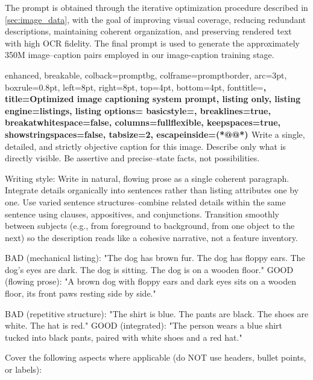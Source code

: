 The prompt is obtained through the iterative optimization procedure described in \cref{sec:image_data}, with the goal of improving visual coverage, reducing redundant descriptions, maintaining coherent organization, and preserving rendered text with high OCR fidelity. The final prompt is used to generate the approximately 350M image--caption pairs employed in our image-caption training stage.
\begin{tcblisting}{
  enhanced,
  breakable,
  colback=promptbg,
  colframe=promptborder,
  arc=3pt,
  boxrule=0.8pt,
  left=8pt,
  right=8pt,
  top=4pt,
  bottom=4pt,
  fonttitle=\bfseries\sffamily,
  title={Optimized image captioning system prompt},
  listing only,
  listing engine=listings,
  listing options={
    basicstyle=\fontsize{6pt}{7pt}\selectfont\ttfamily,
    breaklines=true,
    breakatwhitespace=false,
    columns=fullflexible,
    keepspaces=true,
    showstringspaces=false,
    tabsize=2,
    escapeinside={(*@}{@*)}
  }
}
Write a single, detailed, and strictly objective caption for this image. Describe only what is directly visible. Be assertive and precise--state facts, not possibilities.

Writing style: Write in natural, flowing prose as a single coherent paragraph. Integrate details organically into sentences rather than listing attributes one by one. Use varied sentence structures--combine related details within the same sentence using clauses, appositives, and conjunctions. Transition smoothly between subjects (e.g., from foreground to background, from one object to the next) so the description reads like a cohesive narrative, not a feature inventory.

BAD (mechanical listing): "The dog has brown fur. The dog has floppy ears. The dog's eyes are dark. The dog is sitting. The dog is on a wooden floor."
GOOD (flowing prose): "A brown dog with floppy ears and dark eyes sits on a wooden floor, its front paws resting side by side."

BAD (repetitive structure): "The shirt is blue. The pants are black. The shoes are white. The hat is red."
GOOD (integrated): "The person wears a blue shirt tucked into black pants, paired with white shoes and a red hat."

Cover the following aspects where applicable (do NOT use headers, bullet points, or labels):


\end{tcblisting}
